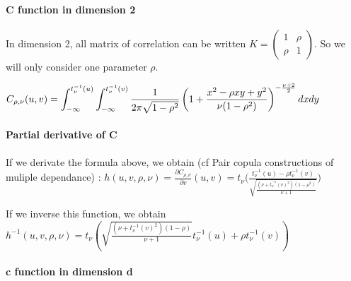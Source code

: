 \documentclass{article}
\begin{document}
\paragraph{C function in dimension 2} 
 	
 	In dimension 2, all matrix of correlation can be written \begin{math} K = 
 \begin{pmatrix}
  1 & \rho \\
  \rho & 1
 \end{pmatrix}
\end{math}. So we will only consider one parameter \begin{math} \rho \end{math}.\newline
\newline

\begin{math}
	C_{\rho,\nu} (u,v) = \mathlarger{\int_{-\infty}^{t_\nu^{-1}(u)}\int_{-\infty}^{t_\nu^{-1}(v)} \frac{1}{2\pi\sqrt{1-\rho^{2}}}\left(1+\frac{x^2 -\rho x y + y^2}{\nu (1-\rho^2)}\right)^{-\frac{\nu +2}{2}}dx dy} 
\end{math}
\newline

 
\paragraph{Partial derivative of C}


If we derivate the formula above, we obtain (cf Pair copula constructions of muliple dependance) : \newline
\begin{math}
h(u,v,\rho,\nu)=\frac{\partial C_{\rho,\nu}}{\partial v} (u,v) = t_\nu \bigg(\frac{t_\nu^{-1}(u)-\rho t_\nu^{-1}(v)}{\sqrt{\frac{(\nu+t_\nu^{-1}(v)^2)(1-\rho ^2)}{\nu+1}}}\bigg)
\end{math}

If we inverse this function, we obtain\newline
\newline
\begin{math}
h^{-1}(u,v,\rho,\nu) = t_\nu (\sqrt{\frac{(\nu+t_\nu^{-1}(v)^2)(1-\rho)}{\nu+1}}t_\nu^{-1}(u)+\rho t_\nu^{-1}(v))
\end{math}

	 
	\paragraph{c function in dimension d}	 
	
\end{document}
